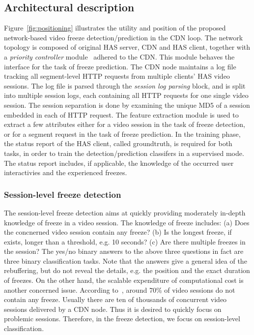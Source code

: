\documentclass[journal]{IEEEtran}
\begin{document}
\subsection{Architectural description}
Figure~\ref{fig:positioning} illustrates the utility and position of the proposed network-based video freeze detection/prediction in the CDN loop. The network topology is composed of original HAS server, CDN and HAS client, together with a {\it priority controller} module~\cite{Petrangeli:qcman15} adhered to the CDN. This module behaves the interface for the task of freeze prediction. The CDN node maintains a log file tracking all segment-level HTTP requests from multiple clients' HAS video sessions. The log file is parsed through the {\it session log parsing} block, and is split into multiple session logs, each containing all HTTP requests for one single video session. The session separation is done by examining the unique MD5 of a session embedded in each of HTTP request. The feature extraction module is used to extract a few attributes either for a video session in the task of freeze detection, or for a segment request in the task of freeze prediction. In the training phase, the status report of the HAS client, called groundtruth, is required for both tasks, in order to train the detection/prediction classifers in a supervised mode. The status report includes, if applicable, the knowledge of the occurred user interactivies and the experienced freezes.

\subsubsection{Session-level freeze detection}
The session-level freeze detection aims at quickly providing moderately in-depth knowledge of freeze in a video session. The knowledge of freeze includes: (a) Does the concnerned video session contain any freeze? (b) Is the longest freeze, if exists, longer than a threshold, e.g. 10 seconds? (c) Are there multiple freezes in the session? The yes/no binary answers to the above three questions in fact are three binary classification tasks. Note that the answers give a general idea of the rebuffering, but do not reveal the details, e.g. the position and the exact duration of freezes. On the other hand, the scalable expenditure of computational cost is another concerned issue. According to~\cite{convivaC:2015}, around 70\% of video sessions do not contain any freeze. Usually there are ten of thousands of concurrent video sessions delivered by a CDN node. Thus it is desired to quickly focus on problemic sessions. Therefore, in the freeze detection, we focus on session-level classification.
\end{document}
